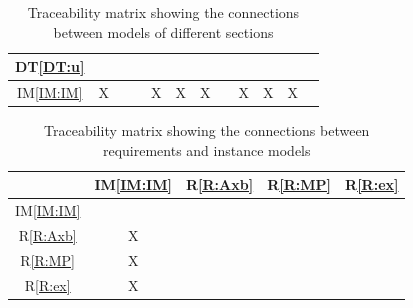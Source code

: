 \documentclass[12pt]{article}
\newcommand{\dtref}[1]{DT\ref{#1}}
\newcommand{\iref}[1]{IM\ref{#1}}
\newcommand{\rref}[1]{R\ref{#1}}
\begin{document}
\begin{table}[h!]
\begin{tabular}{|c|c|c|c|c|c|c|c|c|c|c|c|}
    \dtref{DT:u}        &               &                  &                   &              &                 &                &                   &                     &                  &              &              \\ \hline
    \iref{IM:IM}        & X             &                  &                   & X            & X               & X              &                   & X                   & X                & X            &              \\ \hline
  \end{tabular}
  \caption{Traceability matrix showing the connections between models of different sections}
  \label{Table:trace}
\end{table}

\begin{table}[h!]
\centering
\begin{tabular}{|c|c|c|c|c|} \hline
             & \iref{IM:IM} & \rref{R:Axb} & \rref{R:MP} & \rref{R:ex} \\ \hline
\iref{IM:IM} &              &              &             &             \\ \hline
\rref{R:Axb} & X            &              &             &             \\ \hline
\rref{R:MP}  & X            &              &             &             \\ \hline
\rref{R:ex}  & X            &              &             &             \\ \hline
\end{tabular}
\caption{Traceability matrix showing the connections between requirements and instance models}
\label{Table:R_trace}
\end{table}


\end{document}
